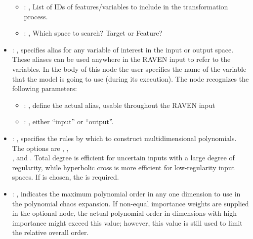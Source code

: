 \begin{itemize}
\begin{itemize}
        \item {}: ,
          List of IDs of features/variables to include in the transformation process.

        \item {}: ,
          Which space to search? Target or Feature?
      \end{itemize}

    \item {}: ,
      specifies alias for         any variable of interest in the input or output space. These
      aliases can be used anywhere in the RAVEN input to         refer to the variables. In the body
      of this node the user specifies the name of the variable that the model is going to use
      (during its execution).
      The  node recognizes the following parameters:
        \begin{itemize}
          \item {}: ,
            define the actual alias, usable throughout the RAVEN input
          \item {}: ,
            either ``input'' or ``output''.
      \end{itemize}

    \item {}: ,
      specifies the rules by which to construct multidimensional polynomials.  The options are
      , ,\\
      , and .
      Total degree is efficient for                                                  uncertain
      inputs with a large degree of regularity, while hyperbolic cross is more efficient
      for low-regularity input spaces.                                                  If
       is chosen, the  is required.

    \item {}: ,
      indicates the maximum polynomial order in any one dimension to use in the
      polynomial chaos expansion. \nb If non-equal importance weights are supplied in the optional
       node, the actual polynomial order in dimensions with high
      importance might exceed this value; however, this value is still used to limit the
      relative overall order.


\end{itemize}
